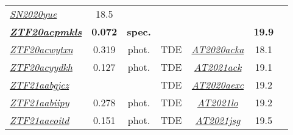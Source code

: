 \begin{table*}
\begin{tabular}{l  c  c  c   c  c  c}
    \textit{\href{https://www.wis-tns.org/object/2020yue}{SN2020yue}}                                 & 18.5           &                                                                                                                  \\
    \textbf{\textit{\href{https://ztfnuclear.simeonreusch.com/transient/ZTF20acpmkls}{ZTF20acpmkls}}} & \textbf{0.072} & \textbf{spec.} & ~                       & ~                 & \textbf{19.9}              &                      \\
    \textit{\href{https://ztfnuclear.simeonreusch.com/transient/ZTF20acwytxn}{ZTF20acwytxn}}          & 0.319          & phot.          & TDE                     &
    \textit{\href{https://www.wis-tns.org/object/2020acka}{AT2020acka}}                               & 18.1           &                                                                                                                  \\
    \textit{\href{https://ztfnuclear.simeonreusch.com/transient/ZTF20acyydkh}{ZTF20acyydkh}}          & 0.127          & phot.          & TDE                     &
    \textit{\href{https://www.wis-tns.org/object/2021ack}{AT2021ack}}                                 & 19.1           &                                                                                                                  \\
    \textit{\href{https://ztfnuclear.simeonreusch.com/transient/ZTF21aabgjcz}{ZTF21aabgjcz}}          & ~              & ~              & TDE                     &
    \textit{\href{https://www.wis-tns.org/object/2020aexc}{AT2020aexc}}                               & 19.2           &                                                                                                                  \\
    \textit{\href{https://ztfnuclear.simeonreusch.com/transient/ZTF21aabiipy}{ZTF21aabiipy}}          & 0.278          & phot.          & TDE                     &
    \textit{\href{https://www.wis-tns.org/object/2021lo}{AT2021lo}}                                   & 19.2           &                                                                                                                  \\
    \textit{\href{https://ztfnuclear.simeonreusch.com/transient/ZTF21aaeoitd}{ZTF21aaeoitd}}          & 0.151          & phot.          & TDE                     &
    \textit{\href{https://www.wis-tns.org/object/2021jsg}{AT2021jsg}}                                 & 19.5           &                                                                                                                  \\

\end{tabular}
\end{table*}
